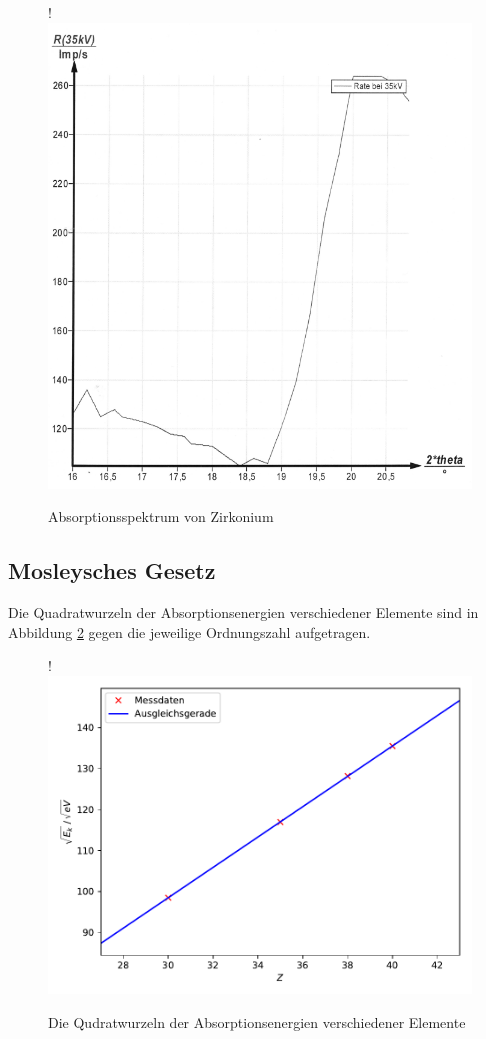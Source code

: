 \begin{figure}[H]!
  \centering
  \includegraphics[scale=0.3]{content/bild4.png}
  \caption{Absorptionsspektrum von Zirkonium}
  \label{fig:plot6}
\end{figure}

\subsection{Mosleysches Gesetz}

Die Quadratwurzeln der Absorptionsenergien verschiedener Elemente
sind in Abbildung \ref{fig:plotx} gegen die jeweilige Ordnungszahl aufgetragen.

\begin{figure}[H]!
  \centering
  \includegraphics[scale=0.7]{content/plot1.pdf}
  \caption{Die Qudratwurzeln der Absorptionsenergien verschiedener Elemente}
  \label{fig:plotx}
\end{figure}

